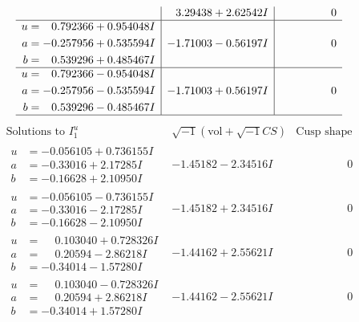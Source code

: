 \documentclass[1p]{elsarticle_modified}
\theoremstyle{definition}
\newcommand{\I}{\sqrt{-1}}
\begin{document}
$$\begin{array}{c|c|c}
 & \phantom{-}3.29438 + 2.62542 I & \phantom{-0.000000 } 0 \\ \hline\begin{aligned}
u &= \phantom{-}0.792366 + 0.954048 I \\
a &= -0.257956 + 0.535594 I \\
b &= \phantom{-}0.539296 + 0.485467 I\end{aligned}
 & -1.71003 - 0.56197 I & \phantom{-0.000000 } 0 \\ \hline\begin{aligned}
u &= \phantom{-}0.792366 - 0.954048 I \\
a &= -0.257956 - 0.535594 I \\
b &= \phantom{-}0.539296 - 0.485467 I\end{aligned}
 & -1.71003 + 0.56197 I & \phantom{-0.000000 } 0\\
 \hline 
 \end{array}$$\newpage$$\begin{array}{c|c|c}  
\text{Solutions to }I^u_{1}& \I (\text{vol} + \sqrt{-1}CS) & \text{Cusp shape}\\
 \hline 
\begin{aligned}
u &= -0.056105 + 0.736155 I \\
a &= -0.33016 + 2.17285 I \\
b &= -0.16628 + 2.10950 I\end{aligned}
 & -1.45182 - 2.34516 I & \phantom{-0.000000 } 0 \\ \hline\begin{aligned}
u &= -0.056105 - 0.736155 I \\
a &= -0.33016 - 2.17285 I \\
b &= -0.16628 - 2.10950 I\end{aligned}
 & -1.45182 + 2.34516 I & \phantom{-0.000000 } 0 \\ \hline\begin{aligned}
u &= \phantom{-}0.103040 + 0.728326 I \\
a &= \phantom{-}0.20594 - 2.86218 I \\
b &= -0.34014 - 1.57280 I\end{aligned}
 & -1.44162 + 2.55621 I & \phantom{-0.000000 } 0 \\ \hline\begin{aligned}
u &= \phantom{-}0.103040 - 0.728326 I \\
a &= \phantom{-}0.20594 + 2.86218 I \\
b &= -0.34014 + 1.57280 I\end{aligned}
 & -1.44162 - 2.55621 I & \phantom{-0.000000 } 0 \\ \hline\begin{aligned}

\end{aligned}
\end{array}$$
\end{document}
